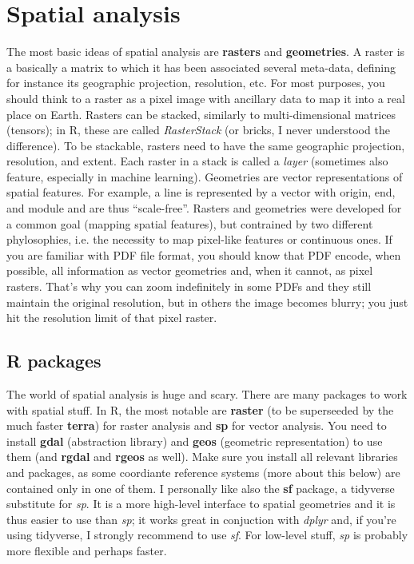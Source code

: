 \documentclass{book}
\begin{document}
\chapter{Spatial analysis}

The most basic ideas of spatial analysis are \textbf{rasters} and \textbf{geometries}. A raster is a basically a matrix to which it has been associated several meta-data, defining for instance its geographic projection, resolution, etc. For most purposes, you should think to a raster as a pixel image with ancillary data to map it into a real place on Earth. Rasters can be stacked, similarly to multi-dimensional matrices (tensors); in R, these are called \textit{RasterStack} (or bricks, I never understood the difference). To be stackable, rasters need to have the same geographic projection, resolution, and extent. Each raster in a stack is called a \textit{layer} (sometimes also feature, especially in machine learning). Geometries are vector representations of spatial features. For example, a line is represented by a vector with origin, end, and module and are thus ``scale-free''. Rasters and geometries were developed for a common goal (mapping spatial features), but contrained by two different phylosophies, i.e. the necessity to map pixel-like features or continuous ones. If you are familiar with PDF file format, you should know that PDF encode, when possible, all information as vector geometries and, when it cannot, as pixel rasters. That's why you can zoom indefinitely in some PDFs and they still maintain the original resolution, but in others the image becomes blurry; you just hit the resolution limit of that pixel raster.

\section{R packages}
The world of spatial analysis is huge and scary. There are many packages to work with spatial stuff. In R, the most notable are \textbf{raster} (to be superseeded by the much faster \textbf{terra}) for raster analysis and \textbf{sp} for vector analysis. You need to install \textbf{gdal} (abstraction library) and \textbf{geos} (geometric representation) to use them (and \textbf{rgdal} and \textbf{rgeos} as well). Make sure you install all relevant libraries and packages, as some coordiante reference systems (more about this below) are contained only in one of them.
I personally like also the \textbf{sf} package, a tidyverse substitute for \textit{sp}. It is a more high-level interface to spatial geometries and it is thus easier to use than \textit{sp}; it works great in conjuction with \textit{dplyr} and, if you're using tidyverse, I strongly recommend to use \textit{sf}. For low-level stuff, \textit{sp} is probably more flexible and perhaps faster.
\end{document}
